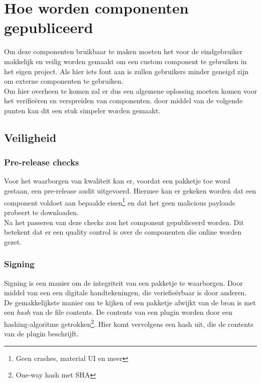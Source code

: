 \chapter{Hoe worden componenten gepubliceerd}

Om deze componenten bruikbaar te maken moeten het voor de eindgebruiker makkelijk en veilig worden gemaakt om een custom component te gebruiken in het eigen project. Als hier iets fout aan is zullen gebruikers minder geneigd zijn om externe componenten te gebruiken. \\

Om hier overheen te komen zal er dus een algemene oplossing moeten komen voor het verifie\"{e}ren en verspreiden van componenten. door middel van de volgende punten kan dit een stuk simpeler worden gemaakt.


\section{Veiligheid}

\subsection{Pre-release checks}

Voor het waarborgen van kwaliteit kan er, voordat een pakketje toe word gestaan, een pre-release audit uitgevoerd. Hiermee kan er gekeken worden dat een component voldoet aan bepaalde eisen\footnote{Geen crashes, material UI en meer} en dat het geen malicious payloads probeert te downloaden. \\ 

Na het passeren van deze checks zou het component gepubliceerd worden. Dit betekent dat er een quality control is over de componenten die online worden gezet.

\subsection{Signing}

Signing is een manier om de integriteit van een pakketje te waarborgen. Door middel van een een digitale handtekeningen, die veriefie\"{e}rbaar is door anderen. \nocite{crypto1} \\

De gemakkelijkste manier om te kijken of een pakketje afwijkt van de bron  is met een \emph{hash} van de file contents. De contents van een plugin worden door een hashing-algoritme getrokken\footnote{One-way hash met SHA}. Hier komt vervolgens een hash uit,  die de contents van de plugin beschrijft. \\

